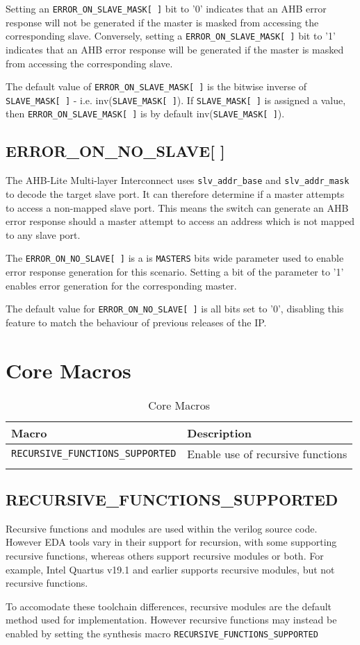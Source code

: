 Setting an \texttt{ERROR\_ON\_SLAVE\_MASK[\,]} bit to '0' indicates that an AHB error response will not be generated if the master is masked from accessing the corresponding slave.
Conversely, setting a \texttt{ERROR\_ON\_SLAVE\_MASK[\,]} bit to '1' indicates that an AHB error response will
be generated if the master is masked from accessing the corresponding slave.

The default value of \texttt{ERROR\_ON\_SLAVE\_MASK[\,]} is the bitwise inverse of \texttt{SLAVE\_MASK[\,]} - i.e. inv(\texttt{SLAVE\_MASK[\,]}). If \texttt{SLAVE\_MASK[\,]} is assigned a value, then \texttt{ERROR\_ON\_SLAVE\_MASK[\,]} is by default inv(\texttt{SLAVE\_MASK[\,]}).

\subsection{ERROR\_ON\_NO\_SLAVE[ ]}\label{error_on_no_slave}

The AHB-Lite Multi-layer Interconnect uses \texttt{slv\_addr\_base} and \texttt{slv\_addr\_mask} to decode the target slave port. It can therefore determine if a master attempts to access a non-mapped slave port. This means the switch can generate an AHB error response should a master attempt to access an address which is not mapped to any slave port.

The \texttt{ERROR\_ON\_NO\_SLAVE[\,]} is a is \texttt{MASTERS} bits wide parameter used to enable error response generation for this scenario. Setting a bit of the parameter to '1' enables error generation for the corresponding master. 

The default value for \texttt{ERROR\_ON\_NO\_SLAVE[\,]} is all bits set to '0', disabling this feature to match the behaviour of previous releases of the IP.

\section{Core Macros}\label{core-macros}

\begin{longtable}[]{@{}ll@{}}
\toprule
Macro & Description\tabularnewline
\midrule
\endhead
\texttt{RECURSIVE\_FUNCTIONS\_SUPPORTED} & Enable use of recursive functions \tabularnewline
\bottomrule
\caption{Core Macros}
\end{longtable}

\subsection{RECURSIVE\_FUNCTIONS\_SUPPORTED}\label{recursive_functions_supported}

Recursive functions and modules are used within the verilog source code. However EDA tools vary in their support for recursion, with some supporting recursive functions, whereas others support recursive modules or both. For example, Intel Quartus v19.1 and earlier supports recursive modules, but not recursive functions. 

To accomodate these toolchain differences, recursive modules are the default method used for implementation. However recursive functions may instead be enabled by setting the synthesis macro \texttt{RECURSIVE\_FUNCTIONS\_SUPPORTED}
